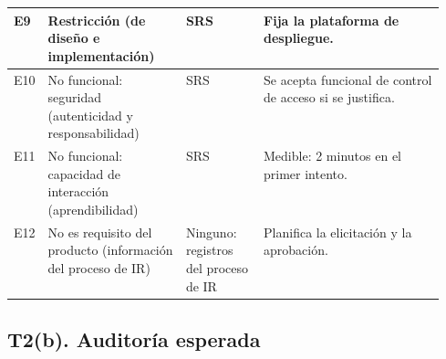 \documentclass[11pt]{article}
\newcommand{\subseccion}[1]{\subsection{\textcolor{midblue}{#1}}}
\begin{document}
{\begin{tabularx}{\linewidth}{|C{0.05\linewidth}|L{0.32\linewidth}|L{0.18\linewidth}|Y|}
	\hline

	E9 & Restricción (de diseño e implementación) & SRS & Fija la plataforma de despliegue.\\

	\hline

	 E10 & No funcional: seguridad (autenticidad y responsabilidad) & SRS & Se acepta funcional de control de acceso si se justifica.\\

	\hline

	E11 & No funcional: capacidad de interacción (aprendibilidad) & SRS & Medible: 2 minutos en el primer intento.\\

	\hline

	 E12 & No es requisito del producto (información del proceso de IR) & Ninguno: registros del proceso de IR & Planifica la elicitación y la aprobación.\\

	\hline

\end{tabularx}

}



\subseccion{T2(b). Auditoría esperada}
\end{document}
